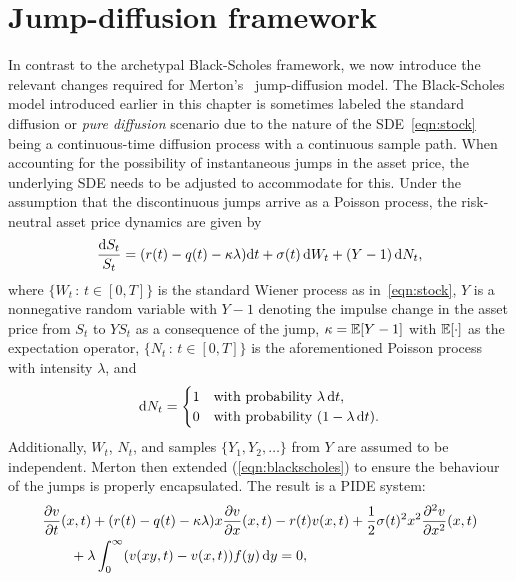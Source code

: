 \section{Jump-diffusion framework}
In contrast to the archetypal Black-Scholes framework, we now introduce the relevant changes required for Merton's~\cite{Merton1976} jump-diffusion model. The Black-Scholes model introduced earlier in this chapter is sometimes labeled the standard diffusion or \emph{pure diffusion} scenario due to the nature of the SDE~\eqref{eqn:stock} being a continuous-time diffusion process with a continuous sample path. When accounting for the possibility of instantaneous jumps in the asset price, the underlying SDE needs to be adjusted to accommodate for this. Under the assumption that the discontinuous jumps arrive as a Poisson process, the risk-neutral asset price dynamics are given by
	\begin{equation}
		\label{eqn:assetPriceDynamics}
		\frac{\mathrm d S_t}{S_t} = (r(t) - q(t) - \kappa\lambda)\mathrm d t + \sigma(t) \, \mathrm d W_t + (Y - 1) \, \mathrm d N_t,
	\end{equation}
where $\{W_t \, : \, t \in [0,T]\}$ is the standard Wiener process as in~\eqref{eqn:stock}, $Y$ is a nonnegative random variable with $Y-1$ denoting the impulse change in the asset price from $S_t$ to $YS_t$ as a consequence of the jump, $\kappa = \mathbb E[Y-1]$ with $\mathbb E[\cdot]$ as the expectation operator, $\{N_t \, : \, t \in [0,T]\}$ is the aforementioned Poisson process with intensity $\lambda$, and
	\begin{equation}
		\label{eqn:dNProb}
		\mathrm d N_t = \begin{cases}
			1 &\mbox{with probability } \lambda \, \mathrm d t, \\
			0 &\mbox{with probability } (1 - \lambda \, \mathrm d t).
		\end{cases}
	\end{equation}
Additionally, $W_t$, $N_t$, and samples $\{Y_1,Y_2,\hdots\}$ from $Y$ are assumed to be independent. Merton then extended (\ref{eqn:blackscholes}) to ensure the behaviour of the jumps is properly encapsulated. The result is a PIDE system:
	\begin{align}
		\label{eqn:PIDE}
		\begin{split}
			&\frac{\partial v}{\partial t}(x,t) + (r(t) - q(t) - \kappa\lambda)x\frac{\partial v}{\partial x}(x,t) - r(t)v(x,t) + \frac{1}{2}\sigma(t)^2x^2\frac{\partial^2 v}{\partial x^2}(x,t) \\
			& \qquad + \lambda \int_0^\infty (v(xy,t) - v(x,t))f(y) \, \mathrm d y = 0,
		\end{split}
	\end{align}
